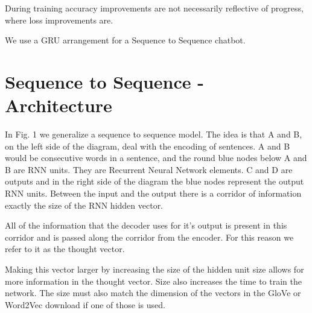 During training accuracy improvements are not necessarily reflective of progress, where loss
improvements are.

We use a GRU arrangement for a Sequence to Sequence chatbot.

\section{Sequence to Sequence - Architecture}

In Fig. 1 we generalize a sequence to sequence model. The idea is
that A and B, on the left side of the diagram, deal with the encoding
of sentences. A and B would be consecutive words in a sentence, and
the round blue nodes below A and B are RNN units. They are Recurrent
Neural Network elements. C and D are outputs and in the right side
of the diagram the blue nodes represent the output RNN units. Between
the input and the output there is a corridor of information exactly
the size of the RNN hidden vector. 

All of the information that the decoder uses for it\textquoteright s
output is present in this corridor and is passed along the corridor
from the encoder. For this reason we refer to it as the thought vector.

Making this vector larger by increasing the size of the hidden unit
size allows for more information in the thought vector. Size also
increases the time to train the network. The size must also match
the dimension of the vectors in the GloVe or Word2Vec download if
one of those is used. 

